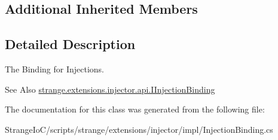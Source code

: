 \subsection*{Additional Inherited Members}


\subsection{Detailed Description}
The Binding for Injections. 

\begin{DoxySeeAlso}{See Also}
\hyperlink{interfacestrange_1_1extensions_1_1injector_1_1api_1_1_i_injection_binding}{strange.\-extensions.\-injector.\-api.\-I\-Injection\-Binding} 
\end{DoxySeeAlso}


The documentation for this class was generated from the following file\-:\begin{DoxyCompactItemize}
\item 
Strange\-Io\-C/scripts/strange/extensions/injector/impl/Injection\-Binding.\-cs\end{DoxyCompactItemize}
